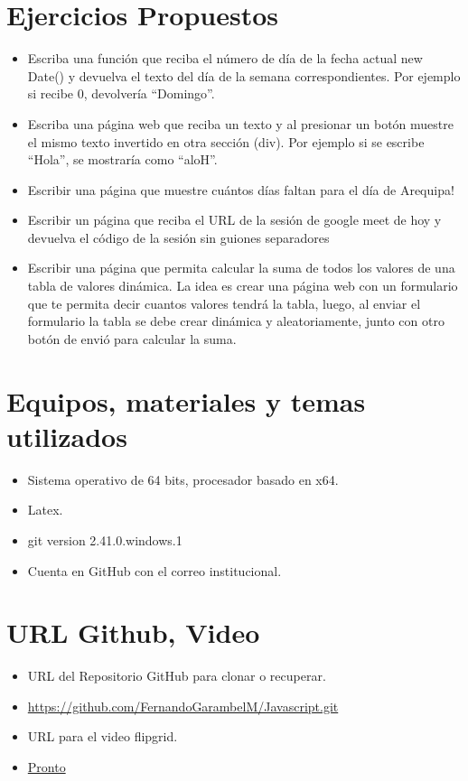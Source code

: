\documentclass{article}
\begin{document}
\section{Ejercicios Propuestos}
	\begin{itemize}		
		\item Escriba una función que reciba el número de día de la fecha actual new Date()  y devuelva el texto del día de la semana correspondientes. Por ejemplo si recibe 0, devolvería “Domingo”.
		\item Escriba una página web que reciba un texto y al presionar un botón muestre el mismo texto invertido en otra sección (div). Por ejemplo si se escribe “Hola”, se mostraría como “aloH”.
		\item Escribir una página que muestre cuántos días faltan para el día de Arequipa!
		\item Escribir un página que reciba el URL de la sesión de google meet de hoy y devuelva el código de la sesión sin guiones separadores
		\item Escribir una página que permita calcular la suma de todos los valores de una tabla de valores dinámica. La idea es crear una página web con un formulario que te permita decir cuantos valores tendrá la tabla, luego, al enviar el formulario la tabla se debe crear dinámica y aleatoriamente, junto con otro botón de envió para calcular la suma.
	\end{itemize}
	\section{Equipos, materiales y temas utilizados}
	\begin{itemize}
		\item Sistema operativo de 64 bits, procesador basado en x64.
		\item Latex. 
		\item git version 2.41.0.windows.1
		\item Cuenta en GitHub con el correo institucional.
	\end{itemize}
	\section{URL Github, Video}
	\begin{itemize}
		\item URL del Repositorio GitHub para clonar o recuperar.
		\item \url{https://github.com/FernandoGarambelM/Javascript.git}
		\item URL para el video flipgrid.
		\item \url{Pronto}	
	\end{itemize}
	\clearpage
\end{document}

